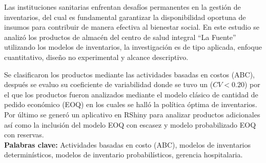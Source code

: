 \begin{resumen}
\justifying
Las instituciones sanitarias enfrentan desafíos permanentes en la gestión de inventarios, del cual es fundamental garantizar la disponibilidad oportuna de insumos para contribuir de manera efectiva al bienestar social. En este estudio se analizó los productos de almacén del centro de salud integral ``La Fuente'' utilizando los modelos de inventarios, la investigación es de tipo aplicada, enfoque cuantitativo, diseño no experimental y alcance descriptivo.

Se clasificaron los productos mediante las actividades basadas en costos (ABC), después se evaluo su coeficiente de variabilidad donde se tuvo un ($CV < 0.20$) por el que los productos fueron analizados mediante el modelo clásico de cantidad de pedido económico (EOQ) en los cuales se halló la política óptima de inventarios. Por último se generó un aplicativo en RShiny para analizar productos adicionales así como la inclusión del modelo EOQ con escasez y modelo probabilizado EOQ con reservas.\\
\textbf{Palabras clave:}
Actividades basadas en costo (ABC), modelos de inventarios determinísticos, modelos de inventario probabilísticos, gerencia hospitalaria.

\end{resumen}
